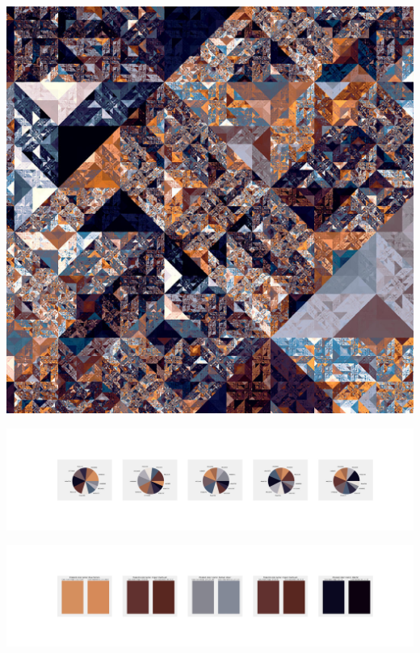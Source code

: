 \documentclass[11pt]{article}
\begin{document}
\begin{landscape}
    \begin{center}
    \includegraphics[width=\textwidth]{./nbimg/file (356).jpg}
    \end{center}

    \begin{center}
    \includegraphics[width=250mm]{./nbimg/pie-285.jpg}
    \end{center}

    \begin{center}
    \includegraphics[width=250mm]{./nbimg/peak-285.jpg}
    \end{center}
    


\end{landscape}
\end{document}
